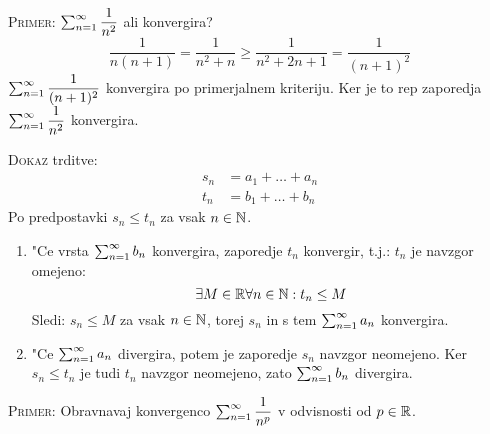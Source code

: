 \textsc{Primer:} $\sum_{n = 1}^{\infty}\dfrac{1}{n^2}$ ali konvergira?
\begin{equation*}
\dfrac{1}{n(n+1)} = \dfrac{1}{n^2 + n} \geq \dfrac{1}{n^2 + 2n + 1}  = \dfrac{1}{(n+1)^2}
\end{equation*}
$\sum_{n = 1}^{\infty}\dfrac{1}{(n+1)^2}$ konvergira po primerjalnem kriteriju. Ker je to rep zaporedja $\sum_{n = 1}^{\infty}\dfrac{1}{n^2}$ konvergira.

\textsc{Dokaz} trditve:
\begin{align*}
s_n &= a_1 + \ldots + a_n \\
t_n &= b_1 + \ldots + b_n
\end{align*}
Po predpostavki $s_n \leq t_n$ za vsak $n \in \mathbb{N}$.
\begin{enumerate}[(1)]
	\item "Ce vrsta $\sum_{n = 1}^{\infty}b_n$ konvergira, zaporedje $t_n$ konvergir, t.j.: $t_n$ je navzgor omejeno:
	\begin{equation*}
	\exists M \in \mathbb{R} \forall n \in \mathbb{N}: t_n \leq M
	\end{equation*}
	Sledi: $s_n \leq M$ za vsak $n \in \mathbb{N}$, torej $s_n$ in s tem $\sum_{n = 1}^{\infty}a_n$ konvergira.
	
	\item "Ce $\sum_{n = 1}^{\infty}a_n$ divergira, potem je zaporedje $s_n$ navzgor neomejeno. Ker $s_n \leq t_n$ je tudi $t_n$ navzgor neomejeno, zato $\sum_{n = 1}^{\infty} b_n$ divergira.
\end{enumerate}
\textsc{Primer:} Obravnavaj konvergenco $\sum_{n = 1}^{\infty}\dfrac{1}{n^p}$ v odvisnosti od $p \in \mathbb{R}$.
